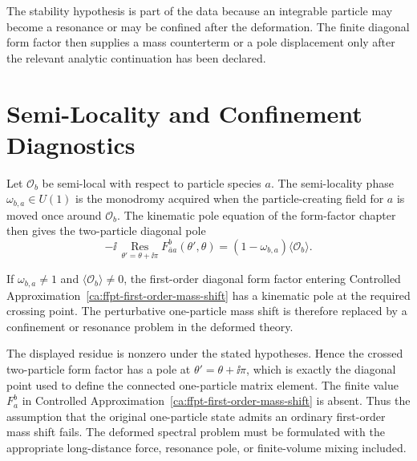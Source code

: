 The stability hypothesis is part of the data because an integrable particle
may become a resonance or may be confined after the deformation.  The finite
diagonal form factor then supplies a mass counterterm or a pole displacement
only after the relevant analytic continuation has been declared.

\section{Semi-Locality and Confinement Diagnostics}

Let \(\mathcal O_b\) be semi-local with respect to particle species \(a\).
The semi-locality phase \(\omega_{b,a}\in U(1)\) is the monodromy acquired
when the particle-creating field for \(a\) is moved once around
\(\mathcal O_b\).  The kinematic pole equation of the form-factor chapter
then gives the two-particle diagonal pole
\[
  -\ii\,\operatorname*{Res}_{\theta'=\theta+\ii\pi}
  F_{\bar a a}^{b}(\theta',\theta)
  =
  \left(1-\omega_{b,a}\right)\langle\mathcal O_b\rangle .
\]

\begin{remark}
\label{rem:semilocal-pole-confinement-diagnostic}
If \(\omega_{b,a}\ne1\) and
\(\langle\mathcal O_b\rangle\ne0\), the first-order diagonal form factor
entering Controlled Approximation~\ref{ca:ffpt-first-order-mass-shift} has a kinematic
pole at the required crossing point.  The perturbative one-particle mass
shift is therefore replaced by a confinement or resonance problem in the
deformed theory.
\end{remark}

The displayed residue is nonzero under the stated hypotheses.  Hence the
crossed two-particle form factor has a pole at
\(\theta'=\theta+\ii\pi\), which is exactly the diagonal point used to define
the connected one-particle matrix element.  The finite value \(F_a^b\) in
Controlled Approximation~\ref{ca:ffpt-first-order-mass-shift} is absent.  Thus the
assumption that the original one-particle state admits an ordinary first-order
mass shift fails.  The deformed spectral problem must be formulated with the
appropriate long-distance force, resonance pole, or finite-volume mixing
included.

